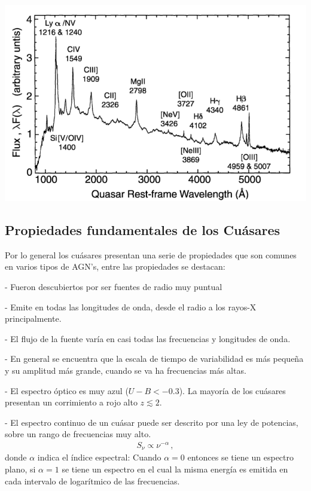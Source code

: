 \includegraphics[scale=.3]{./figures/3_AGNs/Espectro_tipico_AGN.png}
\label{fig:Espectro_QSOs}

	\subsection{Propiedades fundamentales de los Cuásares}
	\label{subsec:Fundamental_properties_quasars}

Por lo general los cuásares presentan una serie de propiedades que son comunes en varios tipos de AGN's, entre las propiedades se destacan:


- Fueron descubiertos por ser fuentes de radio muy puntual 

- Emite en todas las longitudes de onda, desde el radio a los rayos-X principalmente.

- El flujo de la fuente varía en casi todas las frecuencias y longitudes de onda.

- En general se encuentra que la escala de tiempo de variabilidad es más pequeña y su amplitud más grande, cuando se va ha frecuencias más altas.

- El espectro óptico es muy azul ($U-B < -0.3$). La mayoría de los cuásares presentan un corrimiento a rojo alto  $z \lesssim 2$.

- El espectro continuo de un cuásar puede ser descrito por una ley de potencias, sobre un rango de frecuencias muy alto.
%
\begin{align}
S_{\nu} \propto \nu^{-\alpha} \,,
\end{align}
%
 donde $\alpha$ indica el índice espectral: Cuando $\alpha=0$ entonces se tiene un espectro plano, si $\alpha=1$ se tiene un espectro en el cual la misma energía es emitida en cada intervalo de logarítmico de las frecuencias. 


